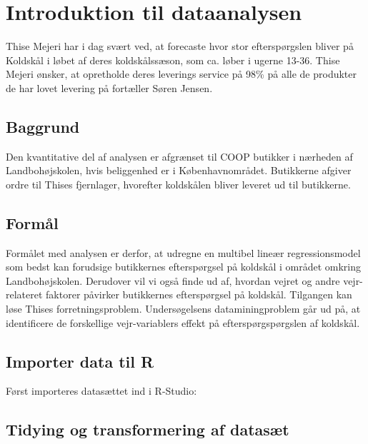 \documentclass[
  12pt,
  a4paper,
  DIV=11,
  numbers=noendperiod,
  oneside,
  open=any]{scrartcl}
\begin{document}
\hypertarget{introduktion-til-dataanalysen}{%
\section{Introduktion til
dataanalysen}\label{introduktion-til-dataanalysen}}

Thise Mejeri har i dag svært ved, at forecaste hvor stor efterspørgslen
bliver på Koldskål i løbet af deres koldskålssæson, som ca. løber i
ugerne 13-36. Thise Mejeri ønsker, at opretholde deres leverings service
på 98\% på alle de produkter de har lovet levering på fortæller Søren
Jensen.

\hypertarget{baggrund}{%
\subsection{Baggrund}\label{baggrund}}

Den kvantitative del af analysen er afgrænset til COOP butikker i
nærheden af Landbohøjskolen, hvis beliggenhed er i Københavnområdet.
Butikkerne afgiver ordre til Thises fjernlager, hvorefter koldskålen
bliver leveret ud til butikkerne.

\hypertarget{formuxe5l}{%
\subsection{Formål}\label{formuxe5l}}

Formålet med analysen er derfor, at udregne en multibel lineær
regressionsmodel som bedst kan forudsige butikkernes efterspørgsel på
koldskål i området omkring Landbohøjskolen. Derudover vil vi også finde
ud af, hvordan vejret og andre vejr-relateret faktorer påvirker
butikkernes efterspørgsel på koldskål. Tilgangen kan løse Thises
forretningsproblem. Undersøgelsens dataminingproblem går ud på, at
identificere de forskellige vejr-variablers effekt på
efterspørgspørgslen af koldskål.

\hypertarget{importer-data-til-r}{%
\subsection{Importer data til R}\label{importer-data-til-r}}

Først importeres datasættet ind i R-Studio:

\hypertarget{tidying-og-transformering-af-datasuxe6t}{%
\subsection{Tidying og transformering af
datasæt}\label{tidying-og-transformering-af-datasuxe6t}}
\end{document}
